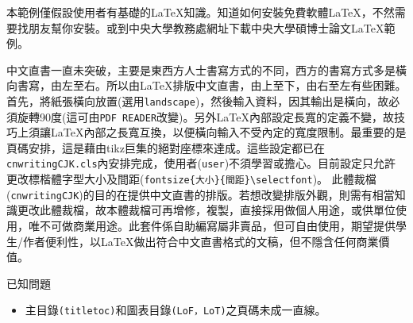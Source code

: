 \begin{preface}
 


本範例僅假設使用者有基礎的\LaTeX 知識。知道如何安裝{\color {red}免費軟體\LaTeX}，不然需要找朋友幫你安裝。或到中央大學教務處網址下載中央大學碩博士論文\LaTeX 範例。

中文直書一直未突破，主要是東西方人士書寫方式的不同，西方的書寫方式多是橫向書寫，由左至右。所以由\LaTeX 排版中文直書，由上至下，由右至左有些困難。首先，將紙張橫向放置(選用{\tt landscape})，然後輸入資料，因其輸出是橫向，故必須旋轉90度(這可由{\tt PDF READER}改變)。另外\LaTeX{}內部設定長寬的定義不變，故技巧上須讓\LaTeX{}內部之長寬互換，以便橫向輸入不受內定的寬度限制。最重要的是頁碼安排，這是藉由tikz巨集的絕對座標來達成。這些設定都已在{\tt cnwritingCJK.cls}內安排完成，使用者({\tt user})不須學習或擔心。目前設定只允許更改標楷體字型大小及間距(\verb|fontsize{大小}{間距}\selectfont|)。
此體裁檔({\tt cnwritingCJK})的目的在提供中文直書的排版。若想改變排版外觀，則需有相當知識更改此體裁檔，故本體裁檔可再增修，複製，直接採用做個人用途，或供單位使用，唯不可做商業用途。此套件係自助編寫屬非賣品，但可自由使用，期望提供學生/作者便利性，以\LaTeX 做出符合中文直書格式的文稿，但不隱含任何商業價值。

\clearpage

{\color{red}已知問題}

\begin{itemize}
\item 主目錄{\tt (titletoc)}和圖表目錄{\tt (LoF，LoT)}之頁碼未成一直線。
\end{itemize}



\end{preface}
